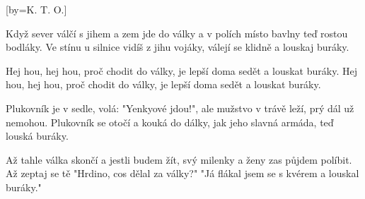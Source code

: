 [by={K. T. O.}]

\beginverse{}
Když sever válčí s jihem a zem jde do války
a v polích místo bavlny teď rostou bodláky.
Ve stínu u silnice vidíš z jihu vojáky,
válejí se klidně a louskaj buráky.
\endverse{}

\beginchorus{}
Hej hou, hej hou, proč chodit do války,
je lepší doma sedět a louskat buráky.
Hej hou, hej hou, proč chodit do války,
je lepší doma sedět a louskat buráky.
\endchorus{}

\beginverse{}
Plukovník je v sedle, volá: "Yenkyové jdou!",
ale mužstvo v trávě leží, prý dál už nemohou.
Plukovník se otočí a kouká do dálky,
jak jeho slavná armáda, teď louská buráky.
\endverse{}

\beginchorus{}
\phantom{}
\endchorus{}

\beginverse{}
Až tahle válka skončí a jestli budem žít,
svý milenky a ženy zas půjdem políbit.
Až zeptaj se tě "Hrdino, cos dělal za války?"
"Já flákal jsem se s kvérem a louskal buráky."
\endverse{}

\beginchorus{}
\phantom{}
\endchorus{}

\endsong{}
